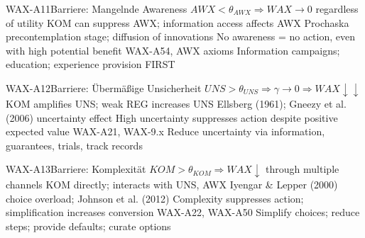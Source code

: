 
\begin{axiomspec}{WAX-A11}{Barriere: Mangelnde Awareness}
 $AWX < \theta_{AWX} \Rightarrow WAX \rightarrow 0$ regardless of utility
 KOM can suppress AWX; information access affects AWX
 Prochaska precontemplation stage; diffusion of innovations
 No awareness = no action, even with high potential benefit
 WAX-A54, AWX axioms
 Information campaigns; education; experience provision FIRST
\end{axiomspec}


\begin{axiomspec}{WAX-A12}{Barriere: Übermäßige Unsicherheit}
 $UNS > \theta_{UNS} \Rightarrow \gamma \rightarrow 0 \Rightarrow WAX \downarrow\downarrow$
 KOM amplifies UNS; weak REG increases UNS
 Ellsberg (1961); Gneezy et al. (2006) uncertainty effect
 High uncertainty suppresses action despite positive expected value
 WAX-A21, WAX-9.x
 Reduce uncertainty via information, guarantees, trials, track records
\end{axiomspec}


\begin{axiomspec}{WAX-A13}{Barriere: Komplexität}
 $KOM > \theta_{KOM} \Rightarrow WAX \downarrow$ through multiple channels
 KOM directly; interacts with UNS, AWX
 Iyengar \& Lepper (2000) choice overload; Johnson et al. (2012)
 Complexity suppresses action; simplification increases conversion
 WAX-A22, WAX-A50
 Simplify choices; reduce steps; provide defaults; curate options
\end{axiomspec}

